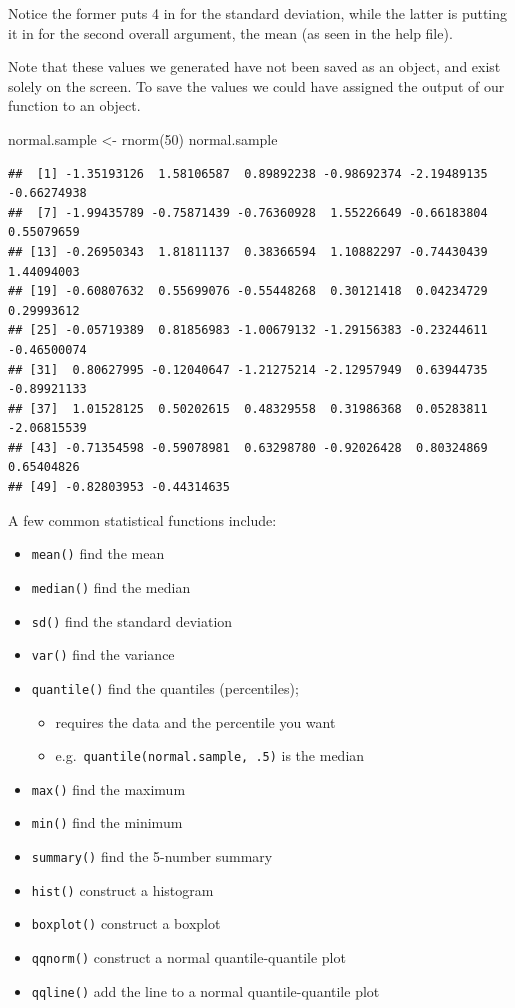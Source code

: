 \documentclass[
]{book}
\newenvironment{Shaded}{\begin{snugshade}}{\end{snugshade}}
\newcommand{\DecValTok}[1]{\textcolor[rgb]{0.00,0.00,0.81}{#1}}
\newcommand{\FunctionTok}[1]{\textcolor[rgb]{0.00,0.00,0.00}{#1}}
\newcommand{\NormalTok}[1]{#1}
\newcommand{\OtherTok}[1]{\textcolor[rgb]{0.56,0.35,0.01}{#1}}
\providecommand{\tightlist}{%
  \setlength{\itemsep}{0pt}\setlength{\parskip}{0pt}}
\begin{document}
Notice the former puts 4 in for the standard deviation, while the latter is putting it in for the second overall argument, the mean (as seen in the help file).

Note that these values we generated have not been saved as an object, and exist solely on the screen. To save the values we could have assigned the output of our function to an object.

\begin{Shaded}
\begin{Highlighting}[]
\NormalTok{normal.sample }\OtherTok{\textless{}{-}} \FunctionTok{rnorm}\NormalTok{(}\DecValTok{50}\NormalTok{)}
\NormalTok{normal.sample}
\end{Highlighting}
\end{Shaded}

\begin{verbatim}
##  [1] -1.35193126  1.58106587  0.89892238 -0.98692374 -2.19489135 -0.66274938
##  [7] -1.99435789 -0.75871439 -0.76360928  1.55226649 -0.66183804  0.55079659
## [13] -0.26950343  1.81811137  0.38366594  1.10882297 -0.74430439  1.44094003
## [19] -0.60807632  0.55699076 -0.55448268  0.30121418  0.04234729  0.29993612
## [25] -0.05719389  0.81856983 -1.00679132 -1.29156383 -0.23244611 -0.46500074
## [31]  0.80627995 -0.12040647 -1.21275214 -2.12957949  0.63944735 -0.89921133
## [37]  1.01528125  0.50202615  0.48329558  0.31986368  0.05283811 -2.06815539
## [43] -0.71354598 -0.59078981  0.63298780 -0.92026428  0.80324869  0.65404826
## [49] -0.82803953 -0.44314635
\end{verbatim}

A few common statistical functions include:

\begin{itemize}
\tightlist
\item
  \texttt{mean()} find the mean
\item
  \texttt{median()} find the median
\item
  \texttt{sd()} find the standard deviation
\item
  \texttt{var()} find the variance
\item
  \texttt{quantile()} find the quantiles (percentiles);

  \begin{itemize}
  \tightlist
  \item
    requires the data and the percentile you want
  \item
    e.g.~\texttt{quantile(normal.sample,\ .5)} is the median
  \end{itemize}
\item
  \texttt{max()} find the maximum
\item
  \texttt{min()} find the minimum
\item
  \texttt{summary()} find the 5-number summary
\item
  \texttt{hist()} construct a histogram
\item
  \texttt{boxplot()} construct a boxplot
\item
  \texttt{qqnorm()} construct a normal quantile-quantile plot
\item
  \texttt{qqline()} add the line to a normal quantile-quantile plot
\end{itemize}
\end{document}
